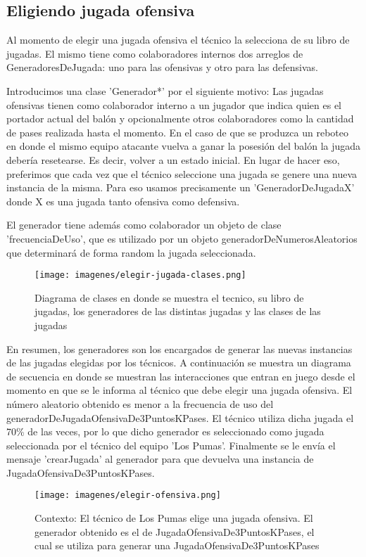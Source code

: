 \subsection{Eligiendo jugada ofensiva}

Al momento de elegir una jugada ofensiva el técnico la selecciona de su libro de jugadas. El mismo tiene como colaboradores internos dos arreglos de 
GeneradoresDeJugada: uno para las ofensivas y otro para las defensivas. 

Introducimos una clase 'Generador*' por el siguiente motivo:
Las jugadas ofensivas tienen como colaborador interno a un jugador que indica quien es el portador actual del balón y opcionalmente otros colaboradores como la
cantidad de pases realizada hasta el momento. En el caso de que se produzca un reboteo en donde el mismo equipo 
atacante vuelva a ganar la posesión del balón la jugada debería resetearse. Es decir, volver a un estado inicial. 
En lugar de hacer eso, preferimos que cada vez que el técnico seleccione una jugada se genere una nueva instancia de la misma.
Para eso usamos precisamente un 'GeneradorDeJugadaX' donde X es una jugada tanto ofensiva como defensiva.

El generador tiene además como colaborador un objeto de clase 'frecuenciaDeUso', que es utilizado por un objeto generadorDeNumerosAleatorios que determinará 
de forma random la jugada seleccionada.

\begin{figure}[h!]
   \texttt{[image: imagenes/elegir-jugada-clases.png]}
   \caption{Diagrama de clases en donde se muestra el tecnico, su libro de jugadas, los generadores de las distintas jugadas y las clases de las jugadas}
\end{figure}

En resumen, los generadores son los encargados de generar las nuevas instancias de las jugadas elegidas por los técnicos. A continuación se muestra un diagrama
de secuencia en donde se muestran las interacciones que entran en juego desde el momento en que se le informa al técnico que debe elegir una jugada ofensiva.
El número aleatorio obtenido es menor a la frecuencia de uso del generadorDeJugadaOfensivaDe3PuntosKPases. El técnico utiliza dicha jugada el 70\% de las veces,
por lo que dicho generador es seleccionado
como jugada seleccionada por el técnico del equipo 'Los Pumas'. Finalmente se le envía el mensaje 'crearJugada' al generador para que devuelva una instancia
de JugadaOfensivaDe3PuntosKPases.

\newpage
\begin{landscape}

\begin{figure}[h!]
   \texttt{[image: imagenes/elegir-ofensiva.png]}
   \caption{Contexto: El técnico de Los Pumas elige una jugada ofensiva. El generador obtenido es el de JugadaOfensivaDe3PuntosKPases, el cual se utiliza para
   generar una JugadaOfensivaDe3PuntosKPases}
\end{figure}

\end{landscape}
\newpage

